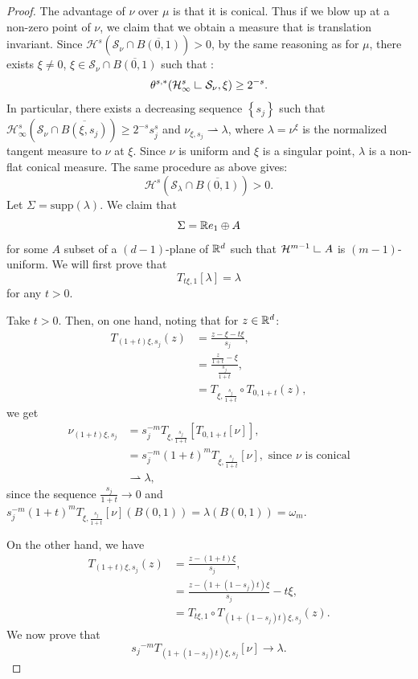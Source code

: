 \documentclass[11pt]{article}
\theoremstyle{definition}
\theoremstyle{remark}
\numberwithin{equation}{section}
\newcommand{\res}{\hbox{{\vrule height .22cm}{\leaders\hrule\hskip .2cm}}}
\def\res{\hbox{ {\vrule height .22cm}{\leaders\hrule\hskip.2cm} } }
\begin{document}
\begin{proof}
The advantage of $\nu$ over $\mu$ is that it is conical. Thus if we blow up at a non-zero point of $\nu$, we claim that we obtain a measure that is translation invariant. 
Since $\mathcal{H}^{s}(\mathcal{S}_{\nu} \cap \overline{B(0,1)})>0$, by the same reasoning as for $\mu$, there exists $\xi \neq 0$, $\xi \in \mathcal{S}_{\nu} \cap \overline{B(0,1)}$ such that : $$\theta^{s,*}(\mathcal{H}_{\infty}^{s} \res \mathcal{S}_{\nu}, \xi) \geq 2^{-s}.$$ In particular, there exists a decreasing sequence $\left\lbrace s_j \right\rbrace$ such that $\mathcal{H}^{s}_{\infty} (\mathcal{S}_{\nu} \cap \overline{B(\xi, s_j)}) \geq 2^{-s} s_{j}^{s}$ and $\nu_{\xi, s_j} \rightharpoonup \lambda$, where $\lambda= \nu^{\xi}$ is the normalized tangent measure to $\nu$ at $\xi$. Since $\nu$ is uniform and $\xi$ is a singular point, $\lambda$ is a non-flat conical measure.
The same procedure as above gives:
\begin{equation}\label{dimred1}
\mathcal{H}^{s}(\mathcal{S}_{\lambda} \cap \overline{B(0,1)})>0.
\end{equation}
Let $\Sigma= \mbox{supp}(\lambda)$. We claim that 
$$ \Sigma = \mathbb{R}  e_1\oplus A $$ for some $A$ subset of a $(d-1)$-plane of $\mathbb{R}^d$  such that $\mathcal{H}^{m-1} \res A$ is $(m-1)$-uniform.
We will first prove that \begin{equation} \label{transinvmeasure}
T_{t \xi, 1} [\lambda]=\lambda 
\end{equation}
 for any $t>0$. 

Take $t>0$.
Then, on one hand,  noting that for $z \in \mathbb{R}^{d}$:
\begin{align*}
T_{(1+t)\xi , s_j}(z) &= \frac{z-\xi - t \xi}{s_j}, \\
&= \frac{\frac{z}{1+t}- \xi}{\frac{s_j}{1+t}} , \\
&= T_{\xi, \frac{s_j}{1+t}} \circ T_{0, 1+t} (z), 
\end{align*}
we get
 \begin{align}\label{nualpha}
\nu_{(1+t)\xi, s_j} &=s_{j}^{-m} T_{\xi, \frac{s_j}{1+t}}[T_{0, 1+t}[\nu]],   \nonumber   \\
&= s_{j}^{-m} (1+t)^{m} T_{\xi,\frac{s_j}{1+t}}[\nu]  , \mbox{ since } \nu \mbox{ is conical} \nonumber \\
& \rightharpoonup \lambda,
\end{align}
since the sequence $\frac{s_j}{1+t} \to 0$ and $s_{j}^{-m} (1+t)^{m} T_{\xi,\frac{s_j}{1+t}}[\nu](B(0,1))=\lambda(B(0,1))=\omega_{m}$.

On the other hand, we have
\begin{align*}
T_{(1+t)\xi, s_j}(z)& = \frac{z-(1+t)\xi}{s_j}, \\
&=\frac{z- (1+(1-s_j)t)\xi}{s_j} -t \xi, \\
&= T_{t \xi, 1} \circ T_{(1+(1-s_j)t)\xi, s_j} (z).
\end{align*}
We now prove that 
\begin{equation}\label{transinvstep}
{s_j}^{-m} T_{(1+(1-s_j)t) \xi , s_j}[\nu] \to \lambda.
\end{equation}


\end{proof}
\end{document}
